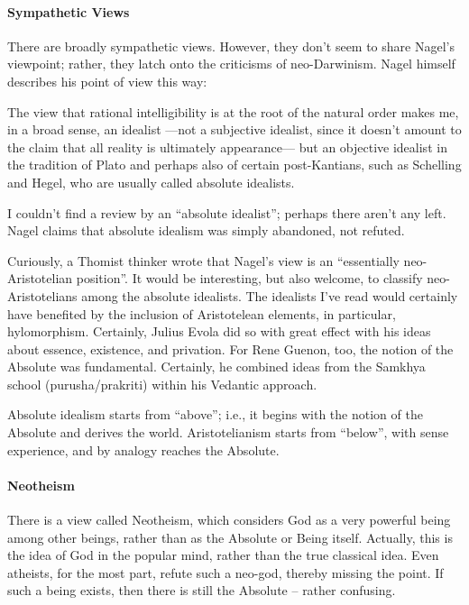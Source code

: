 \paragraph{Sympathetic Views}
There are broadly sympathetic views. However, they don't seem to share Nagel's viewpoint;
rather, they latch onto the criticisms of neo-Darwinism. Nagel himself describes his point of view this way:

\begin{quotex}
The view that rational intelligibility is at the root of the natural order makes me, in a broad sense, an
idealist —not a subjective idealist, since it doesn't amount to the claim that all reality is
ultimately appearance— but an objective idealist in the tradition of Plato and perhaps also of certain
post-Kantians, such as Schelling and Hegel, who are usually called absolute idealists. 

\end{quotex}
I couldn't find a review by an “absolute idealist”; perhaps there aren't any left. Nagel claims
that absolute idealism was simply abandoned, not refuted.

Curiously, a Thomist thinker wrote that Nagel's view is an “essentially neo-Aristotelian position”. It would
be interesting, but also welcome, to classify neo-Aristotelians among the absolute idealists. The idealists
I've read would certainly have benefited by the inclusion of Aristotelean elements, in particular,
hylomorphism. Certainly, Julius Evola did so with great effect with his ideas about essence, existence, and privation.
For Rene Guenon, too, the notion of the Absolute was fundamental. Certainly, he combined ideas from the Samkhya school
(purusha/prakriti) within his Vedantic approach.

Absolute idealism starts from “above”; i.e., it begins with the notion of the Absolute and derives the world.
Aristotelianism starts from “below”, with sense experience, and by analogy reaches the Absolute.

\paragraph{Neotheism}
There is a view called Neotheism, which considers God as a very powerful being among other beings, rather than as the
Absolute or Being itself. Actually, this is the idea of God in the popular mind, rather than the true classical idea.
Even atheists, for the most part, refute such a neo-god, thereby missing the point. If such a being exists, then there
is still the Absolute – rather confusing.

